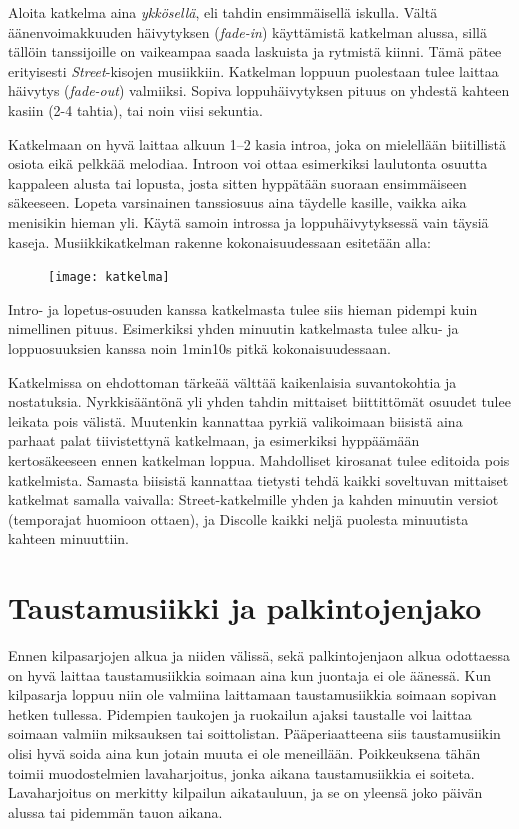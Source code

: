 \documentclass[12pt, a4paper, oneside]{article}
\begin{document}
Aloita katkelma aina \textit{ykkösellä}, eli tahdin ensimmäisellä iskulla.
Vältä äänenvoimakkuuden häivytyksen (\textit{fade-in}) käyttämistä katkelman alussa,
sillä tällöin tanssijoille on vaikeampaa saada laskuista ja rytmistä kiinni.
Tämä pätee erityisesti \textit{Street}-kisojen musiikkiin.
Katkelman loppuun puolestaan tulee laittaa häivytys (\textit{fade-out}) valmiiksi.
Sopiva loppuhäivytyksen pituus on yhdestä kahteen kasiin (2-4 tahtia),
tai noin viisi sekuntia.

Katkelmaan on hyvä laittaa alkuun 1--2 kasia introa,
joka on mielellään biitillistä osiota eikä pelkkää melodiaa.
Introon voi ottaa esimerkiksi laulutonta osuutta kappaleen alusta tai lopusta,
josta sitten hyppätään suoraan ensimmäiseen säkeeseen.
Lopeta varsinainen tanssiosuus aina täydelle kasille,
vaikka aika menisikin hieman yli.
Käytä samoin introssa ja loppuhäivytyksessä vain täysiä kaseja.
Musiikkikatkelman rakenne kokonaisuudessaan esitetään alla: \\

\begin{figure}[ht]
    \centering
    \texttt{[image: katkelma]}
    \label{fig:katkelma}
\end{figure}

Intro- ja lopetus-osuuden kanssa katkelmasta tulee siis hieman pidempi kuin nimellinen pituus.
Esimerkiksi yhden minuutin katkelmasta tulee alku- ja loppuosuuksien kanssa noin 1min10s pitkä kokonaisuudessaan.

Katkelmissa on ehdottoman tärkeää välttää kaikenlaisia suvantokohtia ja nostatuksia.
Nyrkkisääntönä yli yhden tahdin mittaiset biittittömät osuudet tulee leikata pois välistä.
Muutenkin kannattaa pyrkiä valikoimaan biisistä aina parhaat palat tiivistettynä katkelmaan,
ja esimerkiksi hyppäämään kertosäkeeseen ennen katkelman loppua.
Mahdolliset kirosanat tulee editoida pois katkelmista.
Samasta biisistä kannattaa tietysti tehdä kaikki soveltuvan mittaiset katkelmat samalla vaivalla: Street-katkelmille yhden ja kahden minuutin versiot (temporajat huomioon ottaen),
ja Discolle kaikki neljä puolesta minuutista kahteen minuuttiin.

\section{Taustamusiikki ja palkintojenjako} \label{sec:taustamusiikki}

Ennen kilpasarjojen alkua ja niiden välissä,
sekä palkintojenjaon alkua odottaessa on hyvä laittaa taustamusiikkia soimaan aina kun juontaja ei ole äänessä.
Kun kilpasarja loppuu niin ole valmiina laittamaan taustamusiikkia soimaan sopivan hetken tullessa.
Pidempien taukojen ja ruokailun ajaksi taustalle voi laittaa soimaan valmiin miksauksen tai soittolistan.
Pääperiaatteena siis taustamusiikin olisi hyvä soida aina kun jotain muuta ei ole meneillään.
Poikkeuksena tähän toimii muodostelmien lavaharjoitus,
jonka aikana taustamusiikkia ei soiteta.
Lavaharjoitus on merkitty kilpailun aikatauluun,
ja se on yleensä joko päivän alussa tai pidemmän tauon aikana.
\end{document}
